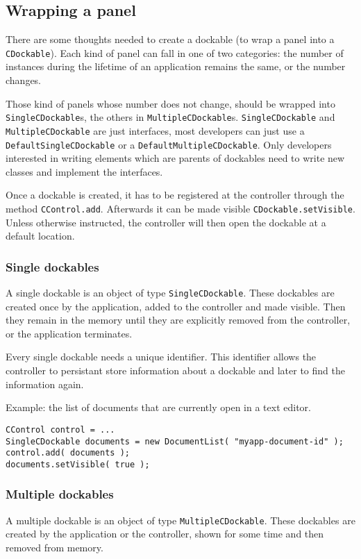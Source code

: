 \documentclass[a4paper,10pt]{article}
\newcommand{\src}[1]{\lstinline[basicstyle=\ttfamily]|#1|}
\begin{document}
\subsection{Wrapping a panel}
There are some thoughts needed to create a dockable (to wrap a panel into a \src{CDockable}). Each kind of panel can fall in one of two categories: the number of instances during the lifetime of an application remains the same, or the number changes.

Those kind of panels whose number does not change, should be wrapped into \src{SingleCDockable}s, the others in \src{MultipleCDockable}s. \src{SingleCDockable} and \src{MultipleCDockable} are just interfaces, most developers can just use a \src{DefaultSingleCDockable} or a \src{DefaultMultipleCDockable}. Only developers interested in writing elements which are parents of dockables need to write new classes and implement the interfaces.

Once a dockable is created, it has to be registered at the controller through the method \src{CControl.add}. Afterwards it can be made visible \src{CDockable.setVisible}. Unless otherwise instructed, the controller will then open the dockable at a default location.

\subsubsection{Single dockables}
A single dockable is an object of type \src{SingleCDockable}. These dockables are created once by the application, added to the controller and made visible. Then they remain in the memory until they are explicitly removed from the controller, or the application terminates.

Every single dockable needs a unique identifier. This identifier allows the controller to persistant store information about a dockable and later to find the information again.

Example: the list of documents that are currently open in a text editor.
\begin{lstlisting}
CControl control = ...
SingleCDockable documents = new DocumentList( "myapp-document-id" );
control.add( documents );
documents.setVisible( true );
\end{lstlisting}

\subsubsection{Multiple dockables}
A multiple dockable is an object of type \src{MultipleCDockable}. These dockables are created by the application or the controller, shown for some time and then removed from memory.
\end{document}
